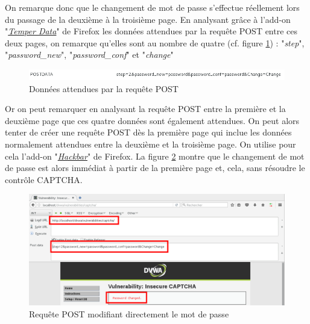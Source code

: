 On remarque donc que le changement de mot de passe s'effectue réellement lors du passage de la deuxième à la troisième page. En analysant grâce à l'add-on "\href{https://addons.mozilla.org/fr/firefox/addon/tamper-data/}{\textit{Temper Data}}" de Firefox les données attendues par la requête POST entre ces deux pages, on remarque qu'elles sont au nombre de quatre (cf. figure \ref{captcha2}) : "\textit{step}", "\textit{password\_new}", "\textit{password\_conf}" et "\textit{change}"

\begin{figure}[!h]
\begin{center}

\includegraphics[scale=0.6]{images/captcha2.png}

\caption{Données attendues par la requête POST}
\label{captcha2}
\end{center}
\end{figure}

Or on peut remarquer en analysant la requête POST entre la première et la deuxième page que ces quatre données sont également attendues. On peut alors tenter de créer une requête POST dès la première page qui inclue les données normalement attendues entre la deuxième et la troisième page. On utilise pour cela l'add-on "\href{https://addons.mozilla.org/fr/firefox/addon/hackbar/}{\textit{Hackbar}}" de Firefox. La figure \ref{captcha3} montre que le changement de mot de passe est alors immédiat à partir de la première page et, cela, sans résoudre le contrôle CAPTCHA.


\begin{figure}[!h]
\begin{center}

\includegraphics[scale=0.34]{images/captcha3.png}

\caption{Requête POST modifiant directement le mot de passe}
\label{captcha3}
\end{center}
\end{figure}


